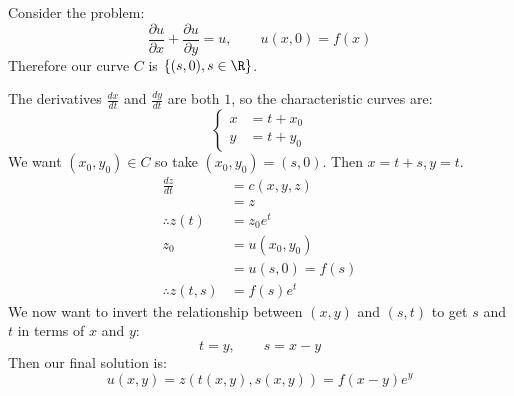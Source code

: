 \documentclass[../Main.tex]{subfiles}
\begin{document}
\begin{example}
    Consider the problem:
    \begin{equation*}
        \frac{\partial u}{\partial x} + \frac{\partial u}{\partial y} = u,\qquad u(x, 0) = f(x)
    \end{equation*}
    Therefore our curve $C$ is $\{(s, 0), s \in \R\}$.

    The derivatives $\frac{dx}{dt}$ and $\frac{dy}{dt}$ are both $1$, so the characteristic curves are:
    \begin{equation*}
        \left\{
        \begin{split}
            x &= t + x_0  \\
            y &= t + y_0
        \end{split}
        \right.
    \end{equation*}
    We want $(x_0, y_0) \in C$ so take $(x_0, y_0) = (s, 0)$. Then $x = t + s, y = t$.
    \begin{align*}
        \frac{dz}{dt} &=c(x, y, z) \\
        &= z \\
        \therefore z(t) &= z_0 e^t \\
        z_0 &= u(x_0, y_0) \\
        &= u(s, 0) = f(s) \\
        \therefore z(t, s) &= f(s) e^t
    \end{align*}
    We now want to invert the relationship between $(x, y)$ and $(s, t)$ to get $s$ and $t$ in terms of $x$ and $y$:
    \begin{equation*}
        t = y,\qquad s = x - y
    \end{equation*}
    Then our final solution is:
    \begin{equation*}
        u(x, y) = z(t(x, y), s(x, y)) = f(x - y) e^y
    \end{equation*}
\end{example}
\end{document}
